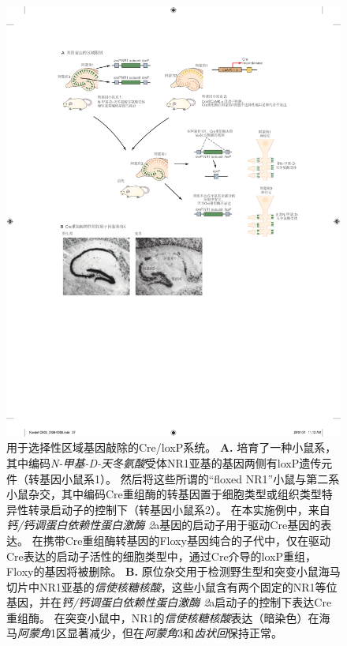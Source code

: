 \begin{figure}[htbp]
	\centering
	\includegraphics[width=1.0\linewidth]{chap02/fig_2_8}
	\caption{用于选择性区域基因敲除的Cre/loxP系统。
		\textbf{A.} 培育了一种小鼠系，其中编码\textit{N-甲基-D-天冬氨酸}受体NR1亚基的基因两侧有loxP遗传元件（转基因小鼠系1）。
		然后将这些所谓的“floxed NR1”小鼠与第二系小鼠杂交，其中编码Cre重组酶的转基因置于细胞类型或组织类型特异性转录启动子的控制下（转基因小鼠系2）。
		在本实施例中，来自\textit{钙/钙调蛋白依赖性蛋白激酶 2}a基因的启动子用于驱动Cre基因的表达。
		在携带Cre重组酶转基因的Floxy基因纯合的子代中，仅在驱动Cre表达的启动子活性的细胞类型中，通过Cre介导的loxP重组，Floxy的基因将被删除。
		\textbf{B.} 原位杂交用于检测野生型和突变小鼠海马切片中NR1亚基的\textit{信使核糖核酸}，这些小鼠含有两个固定的NR1等位基因，并在\textit{钙/钙调蛋白依赖性蛋白激酶 2}a启动子的控制下表达Cre重组酶。
		在突变小鼠中，NR1的\textit{信使核糖核酸}表达（暗染色）在海马\textit{阿蒙角}1区显著减少，但在\textit{阿蒙角}3和\textit{齿状回}保持正常\cite{tsien1996essential}。}
	\label{fig:2_8}
\end{figure}



